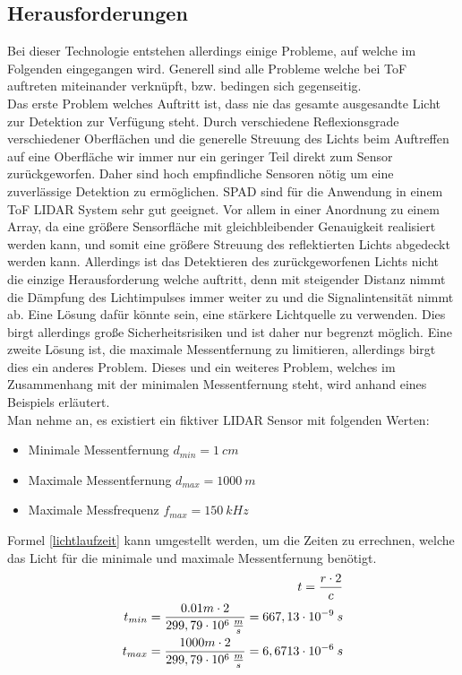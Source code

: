 \subsection{Herausforderungen}\label{subsec:tof_herausvorderungen}
Bei dieser Technologie entstehen allerdings einige Probleme, auf welche im Folgenden eingegangen wird. Generell sind alle Probleme welche bei \ac{ToF} auftreten miteinander verknüpft, bzw. bedingen sich gegenseitig. \\
Das erste Problem welches Auftritt ist, dass nie das gesamte ausgesandte Licht zur Detektion zur Verfügung steht. Durch verschiedene Reflexionsgrade verschiedener Oberflächen und die generelle Streuung des Lichts beim Auftreffen auf eine Oberfläche wir immer nur ein geringer Teil direkt zum Sensor zurückgeworfen. Daher sind hoch empfindliche Sensoren nötig um eine zuverlässige Detektion zu ermöglichen.
\ac{SPAD} sind für die Anwendung in einem \ac{ToF} \ac{LIDAR} System sehr gut geeignet. Vor allem in einer Anordnung zu einem Array, da eine größere Sensorfläche mit gleichbleibender Genauigkeit realisiert werden kann, und somit eine größere Streuung des reflektierten Lichts abgedeckt werden kann. Allerdings ist das Detektieren des zurückgeworfenen Lichts nicht die einzige Herausforderung welche auftritt, denn mit steigender Distanz nimmt die Dämpfung des Lichtimpulses immer weiter zu und die Signalintensität nimmt ab. 
Eine Lösung dafür könnte sein, eine stärkere Lichtquelle zu verwenden. Dies birgt allerdings große Sicherheitsrisiken und ist daher nur begrenzt möglich. Eine zweite Lösung ist, die maximale Messentfernung zu limitieren, allerdings birgt dies ein anderes Problem. Dieses und ein weiteres Problem, welches im Zusammenhang mit der minimalen Messentfernung steht, wird anhand eines Beispiels erläutert.\\
Man nehme an, es existiert ein fiktiver \ac{LIDAR} Sensor mit folgenden Werten:
\begin{itemize}
	\item Minimale Messentfernung $d_{min}=1\:cm$
	\item Maximale Messentfernung $d_{max}=1000\: m$
	\item Maximale Messfrequenz $f_{max}=150\: kHz$ 
\end{itemize}
Formel \ref{lichtlaufzeit} kann umgestellt werden, um die Zeiten zu errechnen, welche das Licht für die minimale und maximale Messentfernung benötigt. 
\begin{equation}\formelentry{Berechnung der minimalen und maximalen Zeit}
	\begin{split}
		t = \frac{r \cdot 2}{c}\\
		t_{min} = \frac{0.01 m \cdot 2}{299,79 \cdot 10^6\: \frac{m}{s}} = 667,13 \cdot 10^{-9}\:s\\
		t_{max} = \frac{1000 m \cdot 2}{299,79 \cdot 10^6\: \frac{m}{s}} = 6,6713 \cdot 10^{-6}\:s\\
	\end{split}
\end{equation} 
